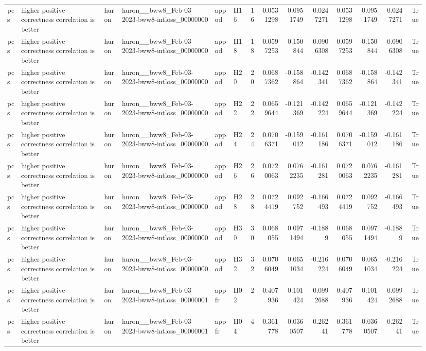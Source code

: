 \begin{longtable}{llllllrrrrrrrr}
pcs & higher positive correctness correlation is better & huron & huron\_\_bww8\_Feb-03-2023-bww8-intloss\_00000000 & appod & H16 & 16 & 0.0531298 & -0.0951749 & -0.0247271 & 0.0531298 & -0.0951749 & -0.0247271 & True \\
pcs & higher positive correctness correlation is better & huron & huron\_\_bww8\_Feb-03-2023-bww8-intloss\_00000000 & appod & H18 & 18 & 0.0597253 & -0.150844 & -0.0906308 & 0.0597253 & -0.150844 & -0.0906308 & True \\
pcs & higher positive correctness correlation is better & huron & huron\_\_bww8\_Feb-03-2023-bww8-intloss\_00000000 & appod & H20 & 20 & 0.0687362 & -0.158864 & -0.142341 & 0.0687362 & -0.158864 & -0.142341 & True \\
pcs & higher positive correctness correlation is better & huron & huron\_\_bww8\_Feb-03-2023-bww8-intloss\_00000000 & appod & H22 & 22 & 0.0659644 & -0.121369 & -0.142224 & 0.0659644 & -0.121369 & -0.142224 & True \\
pcs & higher positive correctness correlation is better & huron & huron\_\_bww8\_Feb-03-2023-bww8-intloss\_00000000 & appod & H24 & 24 & 0.0706371 & -0.159012 & -0.161186 & 0.0706371 & -0.159012 & -0.161186 & True \\
pcs & higher positive correctness correlation is better & huron & huron\_\_bww8\_Feb-03-2023-bww8-intloss\_00000000 & appod & H26 & 26 & 0.0720063 & 0.0762235 & -0.161281 & 0.0720063 & 0.0762235 & -0.161281 & True \\
pcs & higher positive correctness correlation is better & huron & huron\_\_bww8\_Feb-03-2023-bww8-intloss\_00000000 & appod & H28 & 28 & 0.0724419 & 0.092752 & -0.166493 & 0.0724419 & 0.092752 & -0.166493 & True \\
pcs & higher positive correctness correlation is better & huron & huron\_\_bww8\_Feb-03-2023-bww8-intloss\_00000000 & appod & H30 & 30 & 0.068055 & 0.0971494 & -0.1889 & 0.068055 & 0.0971494 & -0.1889 & True \\
pcs & higher positive correctness correlation is better & huron & huron\_\_bww8\_Feb-03-2023-bww8-intloss\_00000000 & appod & H32 & 32 & 0.0706049 & 0.0651034 & -0.216224 & 0.0706049 & 0.0651034 & -0.216224 & True \\
pcs & higher positive correctness correlation is better & huron & huron\_\_bww8\_Feb-03-2023-bww8-intloss\_00000001 & appfr & H02 & 2 & 0.407936 & -0.101424 & 0.0992688 & 0.407936 & -0.101424 & 0.0992688 & True \\
pcs & higher positive correctness correlation is better & huron & huron\_\_bww8\_Feb-03-2023-bww8-intloss\_00000001 & appfr & H04 & 4 & 0.361778 & -0.0360507 & 0.26241 & 0.361778 & -0.0360507 & 0.26241 & True \\

\end{longtable}

